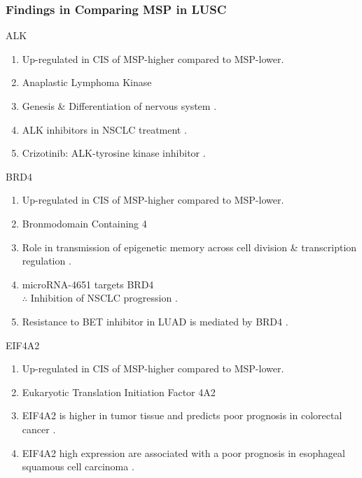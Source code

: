 \documentclass{beamer}
\begin{document}
    \begin{frame}[allowframebreaks]
        \frametitle{Findings in Comparing MSP in LUSC}

        \begin{block}{ALK}
            \begin{enumerate}
                \item Up-regulated in CIS of MSP-higher compared to MSP-lower.
                \item Anaplastic Lymphoma Kinase
                \item Genesis \& Differentiation of nervous system \cite{ALK-1}.
                \item ALK inhibitors in NSCLC treatment \cite{ALK-2}.
                \item Crizotinib: ALK-tyrosine kinase inhibitor \cite{ALK-3}.
            \end{enumerate}
        \end{block}

        \begin{block}{BRD4}
            \begin{enumerate}
                \item Up-regulated in CIS of MSP-higher compared to MSP-lower.
                \item Bronmodomain Containing 4
                \item Role in transmission of epigenetic memory across cell division \& transcription regulation \cite{BRD4-1}.
                \item microRNA-4651 targets BRD4 \\
                    $\therefore$ Inhibition of NSCLC progression \cite{BRD4-2}.
                \item Resistance to BET inhibitor in LUAD is mediated by BRD4 \cite{BRD4-3}.
            \end{enumerate}
        \end{block}

         \begin{block}{EIF4A2}
            \begin{enumerate}
                \item Up-regulated in CIS of MSP-higher compared to MSP-lower.
                \item Eukaryotic Translation Initiation Factor 4A2
                \item EIF4A2 is higher in tumor tissue and predicts poor prognosis in colorectal cancer \cite{EIF4A2-1}.
                \item EIF4A2 high expression are associated with a poor prognosis in esophageal squamous cell carcinoma \cite{EIF4A2-2}.
            \end{enumerate}
        \end{block}


\end{frame}
\end{document}
